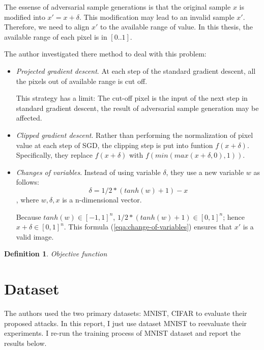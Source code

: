 \documentclass[12pt]{article}
\newtheorem{definition}{Definition}
\begin{document}
The essense of adversarial sample generations is that the original sample $x$ is modified into $x' = x + \delta$. This modification may lead to an invalid sample $x'$. Therefore, we need to align $x'$ to the available range of value. In this thesis, the available range of each pixel is in $[0..1]$.

The author investigated there method to deal with this problem:

\begin{itemize}
	\item \textit{Projected gradient descent}. At each step of the standard gradient descent, all the pixels out of available range is cut off. 
	
	This strategy has a limit: The cut-off pixel is the input of the next step in standard gradient descent, the result of adversarial sample generation may be affected.
	
	\item \textit{Clipped gradient descent}. Rather than performing the normalization of pixel value at each step of SGD, the clipping step is put into funtion $f(x+\delta)$. Specifically, they replace $f(x+\delta)$ with $f(min(max(x+\delta, 0), 1))$.
	
	
	\item \textit{Changes of variables}. Instead of using variable $\delta$, they use a new variable $w$ as follows:
	\begin{equation}
		\delta = 1/2 * (tanh(w) + 1) - x \label{eqn:change-of-variables}
	\end{equation},
	where $w, \delta, x$ is a n-dimensional vector.
	
	Because $tanh(w) \in [-1, 1]^n$, $1/2 * (tanh(w) + 1) \in [0, 1]^n$; hence $x + \delta \in [0,1]^n$. This formula (\ref{eqa:change-of-variables}) ensures that $x'$ is a valid image. 
\end{itemize}

\begin{definition}
	Objective function
\end{definition}


\section{Dataset}

The authors used the two primary datasets: MNIST, CIFAR to evaluate their proposed attacks. In this report, I just use dataset MNIST to reevaluate their experiments. I re-run the training process of MNIST dataset and report the results below.
\end{document}
